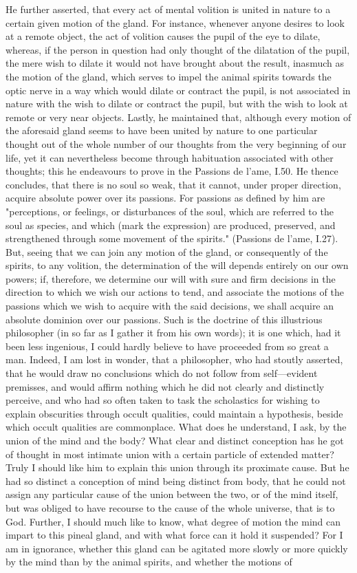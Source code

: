 \documentclass[12pt]{article}
\begin{document}
He further asserted, that every act of mental volition is united in nature to a certain given motion of the gland. For instance, whenever anyone desires to look at a remote object, the act of volition causes the pupil of the eye to dilate, whereas, if the person in question had only thought of the dilatation of the pupil, the mere wish to dilate it would not have brought about the result, inasmuch as the motion of the gland, which serves to impel the animal spirits towards the optic nerve in a way which would dilate or contract the pupil, is not associated in nature with the wish to dilate or contract the pupil, but with the wish to look at remote or very near objects. Lastly, he maintained that, although every motion of the aforesaid gland seems to have been united by nature to one particular thought out of the whole number of our thoughts from the very beginning of our life, yet it can nevertheless become through habituation associated with other thoughts; this he endeavours to prove in the Passions de l'ame, I.50. He thence concludes, that there is no soul so weak, that it cannot, under proper direction, acquire absolute power over its passions. For passions as defined by him are "perceptions, or feelings, or disturbances of the soul, which are referred to the soul as species, and which (mark the expression) are produced, preserved, and strengthened through some movement of the spirits." (Passions de l'ame, I.27). But, seeing that we can join any motion of the gland, or consequently of the spirits, to any volition, the determination of the will depends entirely on our own powers; if, therefore, we determine our will with sure and firm decisions in the direction to which we wish our actions to tend, and associate the motions of the passions which we wish to acquire with the said decisions, we shall acquire an absolute dominion over our passions. Such is the doctrine of this illustrious philosopher (in so far as I gather it from his own words); it is one which, had it been less ingenious, I could hardly believe to have proceeded from so great a man. Indeed, I am lost in wonder, that a philosopher, who had stoutly asserted, that he would draw no conclusions which do not follow from self---evident premisses, and would affirm nothing which he did not clearly and distinctly perceive, and who had so often taken to task the scholastics for wishing to explain obscurities through occult qualities, could maintain a hypothesis, beside which occult qualities are commonplace. What does he understand, I ask, by the union of the mind and the body? What clear and distinct conception has he got of thought in most intimate union with a certain particle of extended matter? Truly I should like him to explain this union through its proximate cause. But he had so distinct a conception of mind being distinct from body, that he could not assign any particular cause of the union between the two, or of the mind itself, but was obliged to have recourse to the cause of the whole universe, that is to God. Further, I should much like to know, what degree of motion the mind can impart to this pineal gland, and with what force can it hold it suspended? For I am in ignorance, whether this gland can be agitated more slowly or more quickly by the mind than by the animal spirits, and whether the motions of 
\end{document}

